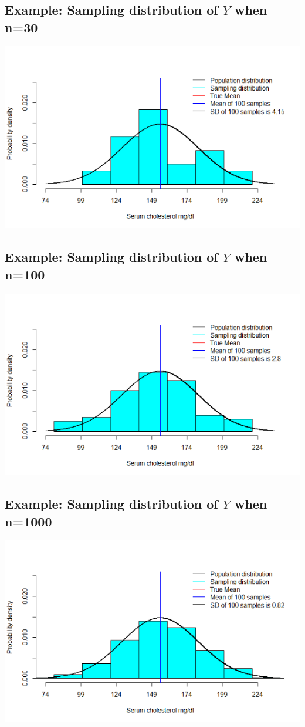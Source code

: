 \documentclass[
]{book}
\begin{document}
\hypertarget{example-sampling-distribution-of-bar-y-when-n30}{%
\subsection{\texorpdfstring{Example: Sampling distribution of \(\bar Y\) when n=30}{Example: Sampling distribution of \textbackslash bar Y when n=30}}\label{example-sampling-distribution-of-bar-y-when-n30}}

\includegraphics[width=0.5\linewidth]{./3_25}

\hypertarget{example-sampling-distribution-of-bar-y-when-n100}{%
\subsection{\texorpdfstring{Example: Sampling distribution of \(\bar Y\) when n=100}{Example: Sampling distribution of \textbackslash bar Y when n=100}}\label{example-sampling-distribution-of-bar-y-when-n100}}

\includegraphics[width=0.5\linewidth]{./3_26}

\hypertarget{example-sampling-distribution-of-bar-y-when-n1000}{%
\subsection{\texorpdfstring{Example: Sampling distribution of \(\bar Y\) when n=1000}{Example: Sampling distribution of \textbackslash bar Y when n=1000}}\label{example-sampling-distribution-of-bar-y-when-n1000}}

\includegraphics[width=0.5\linewidth]{./3_27}
\end{document}
